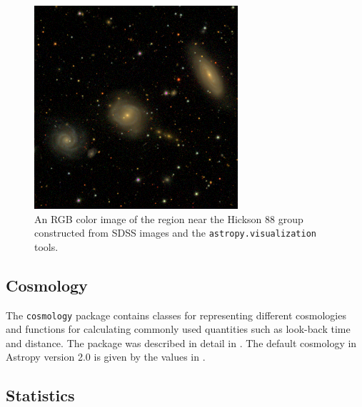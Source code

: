 \documentclass[modern]{aastex61}
\newcommand{\package}[1]{\texttt{#1}\xspace}
\newcommand{\astropy}{Astropy\xspace}
\begin{document}
\begin{figure}
\includegraphics[width=\textwidth]{ngc6977.png}
\caption{An RGB color image of the region near the Hickson 88 group
constructed from SDSS images and the \package{astropy.visualization}
tools.
\label{fig:ngc6977}}
\end{figure}


\subsection{Cosmology}

The \package{cosmology} package contains classes for representing different cosmologies and functions for calculating commonly used quantities such as look-back time and distance.   The package was described in detail in \cite{astropy}.  The default cosmology in \astropy version 2.0 is given by the values in \cite{2016A&A...594A..13P}.

\subsection{Statistics}
\end{document}
